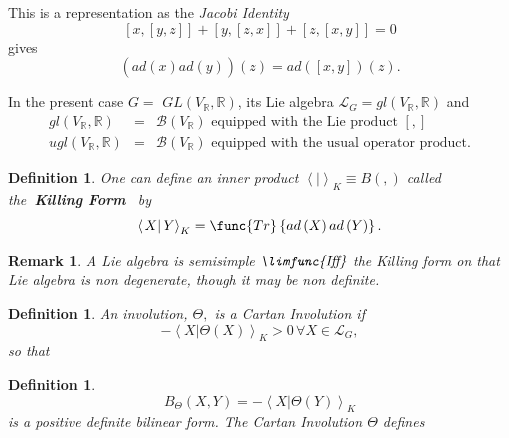 \documentclass[aps,preprint]{revtex4}
\newtheorem{definition}[theorem]{Definition}
\newtheorem{remark}[theorem]{Remark}
\begin{document}
This is a representation as the \emph{Jacobi Identity} 
\begin{equation}
\left[ x,\left[ y,z\right] \right] +\left[ y,\left[ z,x\right] \right] +%
\left[ z,\left[ x,y\right] \right] =0
\end{equation}%
gives%
\begin{equation}
\left( \overset{}{ad\left( x\right) ad\left( y\right) }\right) \left(
z\right) =ad\left( \left[ x,y\right] \right) \left( z\right) .
\end{equation}

In the present case $G=$ $GL\left( V_{\mathbb{R}},\mathbb{R}\right) $, its
Lie algebra $\mathcal{L}_{G}=gl\left( V_{\mathbb{R}},\mathbb{R}\right) $ and 
\begin{eqnarray}
gl\left( V_{\mathbb{R}},\mathbb{R}\right) &=&\mathcal{B}\left( V_{\mathbb{R}%
}\right) \text{ equipped with the Lie product }\left[ ,\right] \\
ugl\left( V_{\mathbb{R}},\mathbb{R}\right) &=&\mathcal{B}\left( V_{\mathbb{R}%
}\right) \text{ equipped with the usual operator product.}
\end{eqnarray}

\begin{definition}
One can define an inner product $\left\langle \left. {}\right\vert
\right\rangle _{K}\equiv B\left( ,\right) $ called the\textbf{\ Killing Form}%
\emph{\ }by\emph{\ }%
\begin{equation}
\left\langle \left. X\right\vert Y\right\rangle _{K}=\func{Tr}\left\{
ad\left( X\right) ad\left( Y\right) \right\} .
\end{equation}
\end{definition}

\begin{remark}
A Lie algebra is \emph{semisimple }$\emph{\limfunc{Iff}}$ the Killing form
on that Lie algebra is \emph{non degenerate, though it may be non definite}.
\end{remark}

\begin{definition}
An involution, $\Theta ,$ is a \emph{Cartan Involution} if 
\begin{equation}
-\left\langle \left. X\right\vert \Theta \left( X\right) \right\rangle
_{K}>0\,\forall X\in \mathcal{L}_{G},
\end{equation}%
so that
\end{definition}

\begin{definition}
\begin{equation}
B_{\Theta }\left( X,Y\right) =-\left\langle \left. X\right\vert \Theta
\left( Y\right) \right\rangle _{K}
\end{equation}%
is a positive definite bilinear form. The \emph{Cartan Involution} $\Theta $
defines
\end{definition}
\end{document}
